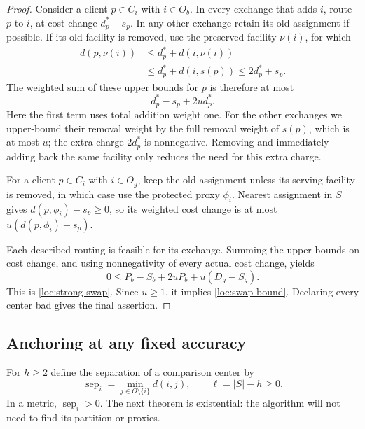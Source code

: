 \begin{proof}
Consider a client $p\in C_i$ with $i\in O_b$.  In every exchange that
adds $i$, route $p$ to $i$, at cost change $d_p^*-s_p$.  In any other
exchange retain its old assignment if possible.  If its old facility
is removed, use the preserved facility $\nu(i)$, for which
\begin{align*}
 d(p,\nu(i))
 &\le d_p^*+d(i,\nu(i))\\
 &\le d_p^*+d(i,s(p))
 \le 2d_p^*+s_p.
\end{align*}
The weighted sum of these upper bounds for $p$ is therefore at most
\[
 d_p^*-s_p+2u d_p^*.
\]
Here the first term uses total addition weight one.  For the other
exchanges we upper-bound their removal weight by the full removal
weight of $s(p)$, which is at most $u$; the extra charge $2d_p^*$ is
nonnegative.  Removing and immediately adding back the same facility
only reduces the need for this extra charge.

For a client $p\in C_i$ with $i\in O_g$, keep the old assignment unless
its serving facility is removed, in which case use the protected
proxy $\phi_i$.  Nearest assignment in $S$ gives
$d(p,\phi_i)-s_p\ge0$, so its weighted cost change is at most
$u(d(p,\phi_i)-s_p)$.

Each described routing is feasible for its exchange.  Summing the
upper bounds on cost change, and using nonnegativity of every actual
cost change, yields
\[
 0\le P_b-S_b+2uP_b+u(D_g-S_g).
\]
This is \eqref{loc:strong-swap}.  Since $u\ge1$, it implies
\eqref{loc:swap-bound}.  Declaring every center bad gives the final
assertion.
\end{proof}

\subsection{Anchoring at any fixed accuracy}

For $h\ge2$ define the separation of a comparison center by
\[
 \operatorname{sep}_i
 =\min_{j\in O\setminus\{i\}}d(i,j),
 \qquad \ell=|S|-h\ge0.
\]
In a metric, $\operatorname{sep}_i>0$.  The next theorem is existential:
the algorithm will not need to find its partition or proxies.

